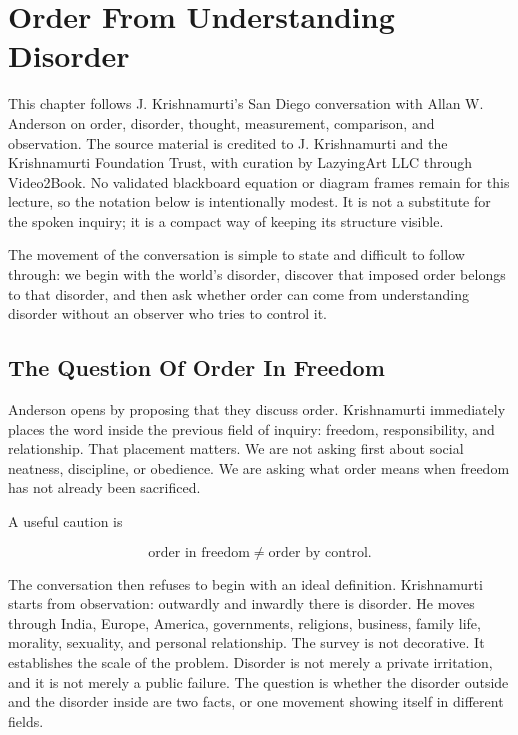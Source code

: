 \chapter{Order From Understanding Disorder}

This chapter follows J. Krishnamurti's San Diego conversation with Allan W. Anderson on order, disorder, thought, measurement, comparison, and observation. The source material is credited to J. Krishnamurti and the Krishnamurti Foundation Trust, with curation by LazyingArt LLC through Video2Book. No validated blackboard equation or diagram frames remain for this lecture, so the notation below is intentionally modest. It is not a substitute for the spoken inquiry; it is a compact way of keeping its structure visible.

The movement of the conversation is simple to state and difficult to follow through: we begin with the world's disorder, discover that imposed order belongs to that disorder, and then ask whether order can come from understanding disorder without an observer who tries to control it.

\section{The Question Of Order In Freedom}

Anderson opens by proposing that they discuss order. Krishnamurti immediately places the word inside the previous field of inquiry: freedom, responsibility, and relationship. That placement matters. We are not asking first about social neatness, discipline, or obedience. We are asking what order means when freedom has not already been sacrificed.

A useful caution is

\begin{equation}
\text{order in freedom} \neq \text{order by control}.
\end{equation}

The conversation then refuses to begin with an ideal definition. Krishnamurti starts from observation: outwardly and inwardly there is disorder. He moves through India, Europe, America, governments, religions, business, family life, morality, sexuality, and personal relationship. The survey is not decorative. It establishes the scale of the problem. Disorder is not merely a private irritation, and it is not merely a public failure. The question is whether the disorder outside and the disorder inside are two facts, or one movement showing itself in different fields.

